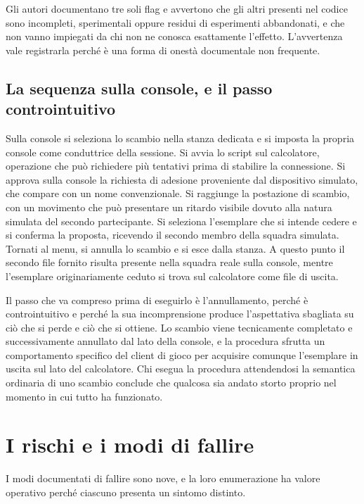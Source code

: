 Gli autori documentano tre soli flag e avvertono che gli altri presenti nel codice sono incompleti, sperimentali oppure residui di esperimenti abbandonati, e che non vanno impiegati da chi non ne conosca esattamente l'effetto. L'avvertenza vale registrarla perché è una forma di onestà documentale non frequente.

\subsection{La sequenza sulla console, e il passo controintuitivo}

Sulla console si seleziona lo scambio nella stanza dedicata e si imposta la propria console come conduttrice della sessione. Si avvia lo script sul calcolatore, operazione che può richiedere più tentativi prima di stabilire la connessione. Si approva sulla console la richiesta di adesione proveniente dal dispositivo simulato, che compare con un nome convenzionale. Si raggiunge la postazione di scambio, con un movimento che può presentare un ritardo visibile dovuto alla natura simulata del secondo partecipante. Si seleziona l'esemplare che si intende cedere e si conferma la proposta, ricevendo il secondo membro della squadra simulata. Tornati al menu, si annulla lo scambio e si esce dalla stanza. A questo punto il secondo file fornito risulta presente nella squadra reale sulla console, mentre l'esemplare originariamente ceduto si trova sul calcolatore come file di uscita.

Il passo che va compreso prima di eseguirlo è l'annullamento, perché è controintuitivo e perché la sua incomprensione produce l'aspettativa sbagliata su ciò che si perde e ciò che si ottiene. Lo scambio viene tecnicamente completato e successivamente annullato dal lato della console, e la procedura sfrutta un comportamento specifico del client di gioco per acquisire comunque l'esemplare in uscita sul lato del calcolatore. Chi esegua la procedura attendendosi la semantica ordinaria di uno scambio conclude che qualcosa sia andato storto proprio nel momento in cui tutto ha funzionato.

\section{I rischi e i modi di fallire}

I modi documentati di fallire sono nove, e la loro enumerazione ha valore operativo perché ciascuno presenta un sintomo distinto.

